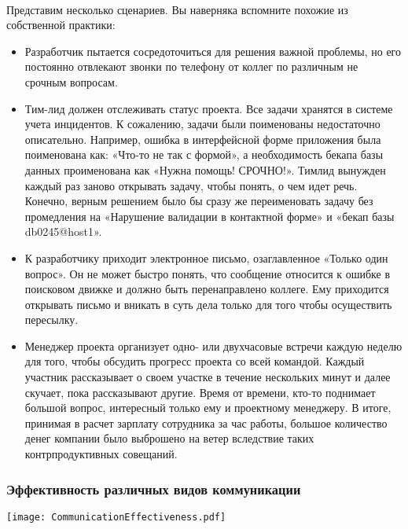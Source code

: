 \documentclass{../industrial-development}
\begin{document}
\lecturenotes
\\Представим несколько сценариев. Вы наверняка вспомните похожие из собственной практики:
\begin{itemize}
\item Разработчик пытается сосредоточиться для решения важной проблемы, но его постоянно отвлекают звонки по телефону от коллег по различным не срочным вопросам.
\item Тим-лид должен отслеживать статус проекта. Все задачи хранятся в системе учета инцидентов. К сожалению, задачи были поименованы недостаточно описательно. Например, ошибка в интерфейсной форме приложения была поименована как: «Что-то не так с формой», а необходимость бекапа базы данных проименована как «Нужна помощь! СРОЧНО!». Тимлид вынужден каждый раз заново открывать задачу, чтобы понять, о чем идет речь. Конечно, верным решением было бы сразу же переименовать задачу без промедления на «Нарушение валидации в контактной форме» и «бекап базы db0245@host1».
\item К разработчику приходит электронное письмо, озаглавленное «Только один вопрос». Он не может быстро понять, что сообщение относится к ошибке в поисковом движке и должно быть перенаправлено коллеге. Ему приходится открывать письмо и вникать в суть дела только для того чтобы осуществить пересылку.
\item Менеджер проекта организует одно- или двухчасовые встречи каждую неделю для того, чтобы обсудить прогресс проекта со всей командой. Каждый участник рассказывает о своем участке в течение нескольких минут и далее скучает, пока рассказывают другие. Время от времени, кто-то поднимает большой вопрос, интересный только ему и проектному менеджеру. В итоге, принимая в расчет зарплату сотрудника за час работы, большое количество денег компании было выброшено на ветер вследствие таких контрпродуктивных совещаний.
\end{itemize}

\begin{frame} \frametitle{Эффективность различных видов коммуникации}
\centerline{\texttt{[image: CommunicationEffectiveness.pdf]}}
\end{frame}

\lecturenotes
\end{document}
